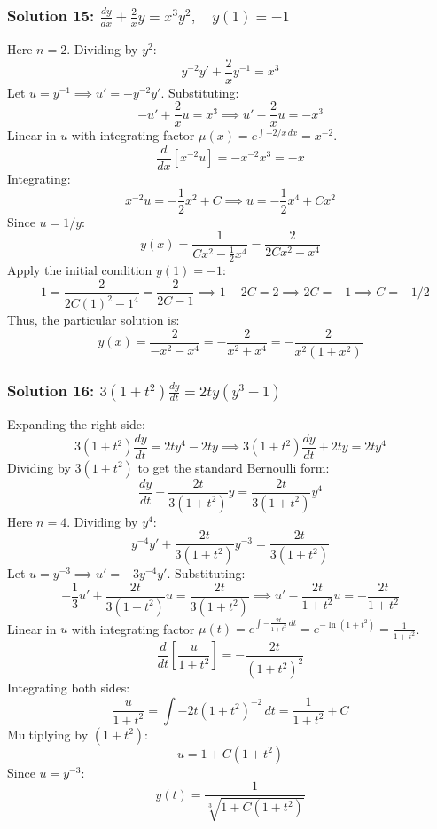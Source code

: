 \documentclass[11pt,letterpaper]{article}
\begin{document}
\subsubsection*{Solution 15: $\frac{dy}{dx} + \frac{2}{x}y = x^3 y^2, \quad y(1) = -1$}
Here $n = 2$. Dividing by $y^2$:
\[ y^{-2}y' + \frac{2}{x}y^{-1} = x^3 \]
Let $u = y^{-1} \implies u' = -y^{-2}y'$. Substituting:
\[ -u' + \frac{2}{x}u = x^3 \implies u' - \frac{2}{x}u = -x^3 \]
Linear in $u$ with integrating factor $\mu(x) = e^{\int -2/x \, dx} = x^{-2}$.
\[ \frac{d}{dx}\left[ x^{-2}u \right] = -x^{-2}x^3 = -x \]
Integrating:
\[ x^{-2}u = -\frac{1}{2}x^2 + C \implies u = -\frac{1}{2}x^4 + C x^2 \]
Since $u = 1/y$:
\[ y(x) = \frac{1}{Cx^2 - \frac{1}{2}x^4} = \frac{2}{2Cx^2 - x^4} \]
Apply the initial condition $y(1) = -1$:
\[ -1 = \frac{2}{2C(1)^2 - 1^4} = \frac{2}{2C - 1} \implies 1 - 2C = 2 \implies 2C = -1 \implies C = -1/2 \]
Thus, the particular solution is:
\[ y(x) = \frac{2}{-x^2 - x^4} = -\frac{2}{x^2 + x^4} = -\frac{2}{x^2(1+x^2)} \]

\subsubsection*{Solution 16: $3(1+t^2)\frac{dy}{dt} = 2ty(y^3 - 1)$}
Expanding the right side:
\[ 3(1+t^2) \frac{dy}{dt} = 2ty^4 - 2ty \implies 3(1+t^2)\frac{dy}{dt} + 2ty = 2ty^4 \]
Dividing by $3(1+t^2)$ to get the standard Bernoulli form:
\[ \frac{dy}{dt} + \frac{2t}{3(1+t^2)}y = \frac{2t}{3(1+t^2)}y^4 \]
Here $n = 4$. Dividing by $y^4$:
\[ y^{-4}y' + \frac{2t}{3(1+t^2)}y^{-3} = \frac{2t}{3(1+t^2)} \]
Let $u = y^{-3} \implies u' = -3y^{-4}y'$. Substituting:
\[ -\frac{1}{3}u' + \frac{2t}{3(1+t^2)}u = \frac{2t}{3(1+t^2)} \implies u' - \frac{2t}{1+t^2}u = -\frac{2t}{1+t^2} \]
Linear in $u$ with integrating factor $\mu(t) = e^{\int -\frac{2t}{1+t^2} \, dt} = e^{-\ln(1+t^2)} = \frac{1}{1+t^2}$.
\[ \frac{d}{dt}\left[ \frac{u}{1+t^2} \right] = -\frac{2t}{(1+t^2)^2} \]
Integrating both sides:
\[ \frac{u}{1+t^2} = \int -2t(1+t^2)^{-2} \, dt = \frac{1}{1+t^2} + C \]
Multiplying by $(1+t^2)$:
\[ u = 1 + C(1+t^2) \]
Since $u = y^{-3}$:
\[ y(t) = \frac{1}{\sqrt[3]{1 + C(1+t^2)}} \]
\end{document}

